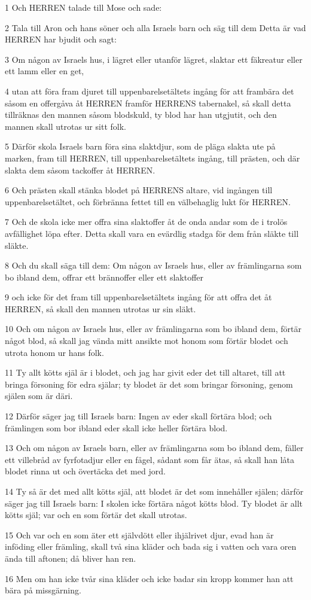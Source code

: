 \par 1 Och HERREN talade till Mose och sade:
\par 2 Tala till Aron och hans söner och alla Israels barn och säg till dem Detta är vad HERREN har bjudit och sagt:
\par 3 Om någon av Israels hus, i lägret eller utanför lägret, slaktar ett fäkreatur eller ett lamm eller en get,
\par 4 utan att föra fram djuret till uppenbarelsetältets ingång för att frambära det såsom en offergåva åt HERREN framför HERRENS tabernakel, så skall detta tillräknas den mannen såsom blodskuld, ty blod har han utgjutit, och den mannen skall utrotas ur sitt folk.
\par 5 Därför skola Israels barn föra sina slaktdjur, som de pläga slakta ute på marken, fram till HERREN, till uppenbarelsetältets ingång, till prästen, och där slakta dem såsom tackoffer åt HERREN.
\par 6 Och prästen skall stänka blodet på HERRENS altare, vid ingången till uppenbarelsetältet, och förbränna fettet till en välbehaglig lukt för HERREN.
\par 7 Och de skola icke mer offra sina slaktoffer åt de onda andar som de i trolös avfällighet löpa efter. Detta skall vara en evärdlig stadga för dem från släkte till släkte.
\par 8 Och du skall säga till dem: Om någon av Israels hus, eller av främlingarna som bo ibland dem, offrar ett brännoffer eller ett slaktoffer
\par 9 och icke för det fram till uppenbarelsetältets ingång för att offra det åt HERREN, så skall den mannen utrotas ur sin släkt.
\par 10 Och om någon av Israels hus, eller av främlingarna som bo ibland dem, förtär något blod, så skall jag vända mitt ansikte mot honom som förtär blodet och utrota honom ur hans folk.
\par 11 Ty allt kötts själ är i blodet, och jag har givit eder det till altaret, till att bringa försoning för edra själar; ty blodet är det som bringar försoning, genom själen som är däri.
\par 12 Därför säger jag till Israels barn: Ingen av eder skall förtära blod; och främlingen som bor ibland eder skall icke heller förtära blod.
\par 13 Och om någon av Israels barn, eller av främlingarna som bo ibland dem, fäller ett villebråd av fyrfotadjur eller en fågel, sådant som får ätas, så skall han låta blodet rinna ut och övertäcka det med jord.
\par 14 Ty så är det med allt kötts själ, att blodet är det som innehåller själen; därför säger jag till Israels barn: I skolen icke förtära något kötts blod. Ty blodet är allt kötts själ; var och en som förtär det skall utrotas.
\par 15 Och var och en som äter ett självdött eller ihjälrivet djur, evad han är inföding eller främling, skall två sina kläder och bada sig i vatten och vara oren ända till aftonen; då bliver han ren.
\par 16 Men om han icke tvår sina kläder och icke badar sin kropp kommer han att bära på missgärning.

